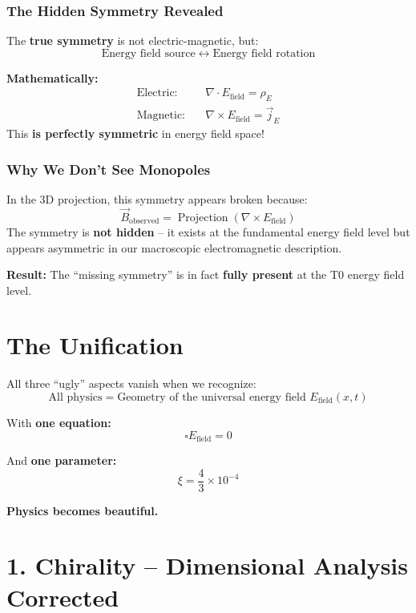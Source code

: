 	\subsubsection*{The Hidden Symmetry Revealed}
	
	The \textbf{true symmetry} is not electric-magnetic, but:
	\[
	\boxed{\text{Energy field source} \;\leftrightarrow\; \text{Energy field rotation}}
	\]
	
	\textbf{Mathematically:}
	\begin{align*}
		\text{Electric:} \quad &\nabla \cdot E_{\text{field}} = \rho_E \\
		\text{Magnetic:} \quad &\nabla \times E_{\text{field}} = \vec{j}_E
	\end{align*}
	This \textbf{is perfectly symmetric} in energy field space!
	
	\subsubsection*{Why We Don't See Monopoles}
	
	In the 3D projection, this symmetry appears broken because:
	\[
	\vec{B}_{\text{observed}} = \operatorname{Projection}(\nabla \times E_{\text{field}})
	\]
	The symmetry is \textbf{not hidden} – it exists at the fundamental energy field level but appears asymmetric in our macroscopic electromagnetic description.
	
	\textbf{Result:} The ``missing symmetry'' is in fact \textbf{fully present} at the T0 energy field level.
	
	
	
	\section*{The Unification}
	
	All three ``ugly'' aspects vanish when we recognize:
	\[
	\boxed{\text{All physics} = \text{Geometry of the universal energy field } E_{\text{field}}(x,t)}
	\]
	
	With \textbf{one equation:}
	\[
	\square E_{\text{field}} = 0
	\]
	
	And \textbf{one parameter:}
	\[
	\xi = \frac{4}{3} \times 10^{-4}
	\]
	
	\textbf{Physics becomes beautiful.}
	
	\section*{1. Chirality – Dimensional Analysis Corrected}
	
